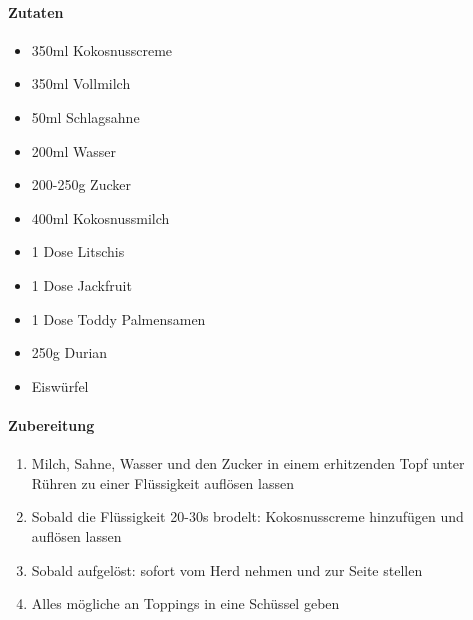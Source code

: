 \clearpage
{}
\label{CheThai}

\paragraph{Zutaten}
\begin{itemize}[noitemsep]
	\item 350ml Kokosnusscreme
	\item 350ml Vollmilch
	\item 50ml Schlagsahne
	\item 200ml Wasser
	\item 200-250g Zucker
	\item 400ml Kokosnussmilch
	\vspace{0.5cm}
	\item 1 Dose Litschis
	\item 1 Dose Jackfruit 
	\item 1 Dose Toddy Palmensamen
	\item 250g Durian
	\item Eiswürfel
\end{itemize}

\paragraph{Zubereitung}
\begin{enumerate}[noitemsep]
	\item Milch, Sahne, Wasser und den Zucker in einem erhitzenden Topf unter Rühren zu einer Flüssigkeit auflösen lassen
	\item Sobald die Flüssigkeit 20-30s brodelt: Kokosnusscreme hinzufügen und auflösen lassen
	\item Sobald aufgelöst: sofort vom Herd nehmen und zur Seite stellen
	\item Alles mögliche an Toppings in eine Schüssel geben
\end{enumerate}
